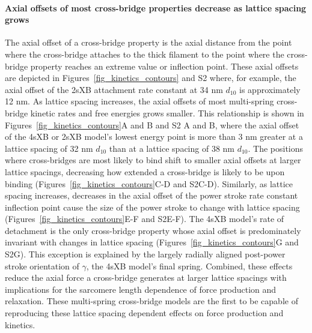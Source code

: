 \documentclass[10pt]{article}
\begin{document}
\paragraph{Axial offsets of most cross-bridge properties decrease as lattice spacing grows} %
The axial offset of a cross-bridge property is the axial distance from the point where the cross-bridge attaches to the thick filament to the point where the cross-bridge property reaches an extreme value or inflection point. 
These axial offsets are depicted in Figures~\ref{fig_kinetics_contours} and S2 where, for example, the axial offset of the 2sXB attachment rate constant at 34 nm $d_{10}$ is approximately 12 nm. 
As lattice spacing increases, the axial offsets of most multi-spring cross-bridge kinetic rates and free energies grows smaller.
This relationship is shown in Figures~\ref{fig_kinetics_contours}A and B and S2 A and B, where the axial offset of the 4sXB or 2sXB model's lowest energy point is more than 3 nm greater at a lattice spacing of 32 nm $d_{10}$ than at a lattice spacing of 38 nm $d_{10}$. 
The positions where cross-bridges are most likely to bind shift to smaller axial offsets at larger lattice spacings, decreasing how extended a cross-bridge is likely to be upon binding (Figures~\ref{fig_kinetics_contours}C-D and S2C-D). 
Similarly, as lattice spacing increases, decreases in the axial offset of the power stroke rate constant inflection point cause the size of the power stroke to change with lattice spacing (Figures~\ref{fig_kinetics_contours}E-F and S2E-F). 
The 4sXB model's rate of detachment is the only cross-bridge property whose axial offset is predominately invariant with changes in lattice spacing (Figures~\ref{fig_kinetics_contours}G and S2G). 
This exception is explained by the largely radially aligned post-power stroke orientation of $\gamma$, the 4sXB model's final spring. 
Combined, these effects reduce the axial force a cross-bridge generates at larger lattice spacings with implications for the sarcomere length dependence of force production and relaxation. 
These multi-spring cross-bridge models are the first to be capable of reproducing these lattice spacing dependent effects on force production and kinetics.
\end{document}
